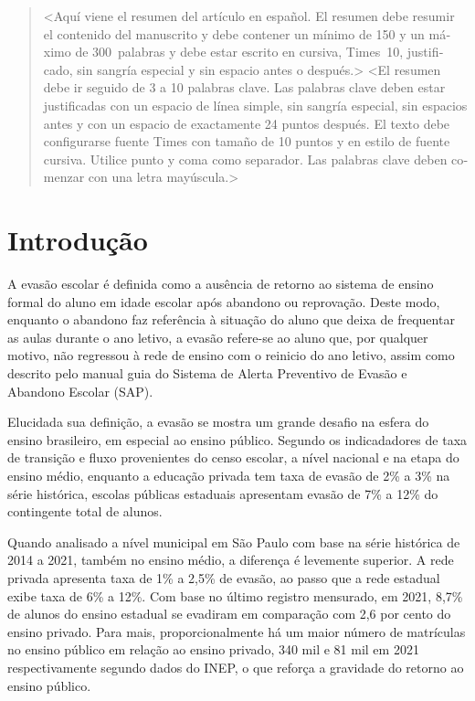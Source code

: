 \documentclass[english, spanish, brazilian]{RBIEarticle} %
\begin{document}
\begin{otherlanguage}{spanish}
\begin{abstract}
<Aquí viene el resumen del artículo en español. El resumen debe resumir el contenido del manuscrito y debe contener un mínimo de 150 y un máximo de 300~palabras y debe estar escrito en cursiva, Times~10, justificado, sin sangría especial y sin espacio antes o después.>
\keywords <El resumen debe ir seguido de 3 a 10 palabras clave. Las palabras clave deben estar justificadas con un espacio de línea simple, sin sangría especial, sin espacios antes y con un espacio de exactamente 24 puntos después. El texto debe configurarse fuente Times con tamaño de 10 puntos y en estilo de fuente cursiva. Utilice punto y coma como separador. Las palabras clave deben comenzar con una letra mayúscula.>
\end{abstract}
\end{otherlanguage}

\pagebreak


\section{Introdução}
A evasão escolar é definida como a ausência de retorno ao sistema de ensino formal do aluno em idade escolar após abandono ou reprovação. Deste modo, enquanto o abandono faz referência à situação do aluno que deixa de frequentar as aulas durante o ano letivo, a evasão refere-se ao aluno que, por qualquer motivo, não regressou à rede de ensino com o reinicio do ano letivo, assim como descrito pelo manual guia do Sistema de Alerta Preventivo  de Evasão e Abandono Escolar (SAP). 

Elucidada sua definição, a evasão se mostra um grande desafio na esfera do ensino brasileiro, em especial ao ensino público. Segundo os indicadadores de taxa de transição e fluxo provenientes do censo escolar, a nível nacional e na etapa do ensino médio, enquanto a educação privada tem taxa de evasão de 2\% a 3\% na série histórica, escolas públicas estaduais apresentam evasão de 7\% a 12\% do contingente total de alunos. 

Quando analisado a nível municipal em São Paulo com base na série histórica de 2014 a 2021, também no ensino médio, a diferença é levemente superior. A rede privada apresenta taxa de 1\% a 2,5\% de evasão, ao passo que a rede estadual exibe taxa de 6\% a 12\%. Com base no último registro mensurado, em 2021, 8,7\% de alunos do ensino estadual se evadiram em comparação com 2,6 por cento do ensino privado. Para mais, proporcionalmente há um maior número de matrículas no ensino público em relação ao ensino privado, 340 mil e 81 mil em 2021 respectivamente segundo dados do INEP, o que reforça a gravidade do retorno ao ensino público. 
\end{document}
